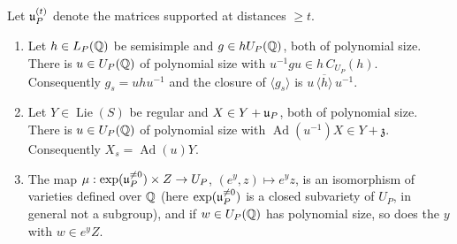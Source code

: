\begin{lemma}\label{lem:iter}
Let $\mathfrak{u}_P^{(t)}$ denote the matrices supported at distances $\ge t$.
\begin{enumerate}
\item Let $h\in L_P(\mathbb{Q})$ be semisimple and $g\in hU_P(\mathbb{Q})$, both of polynomial size. There is
$u\in U_P(\mathbb{Q})$ of polynomial size with $u^{-1}gu\in h\,C_{U_P}(h)$. Consequently $g_s=uhu^{-1}$ and the
closure of $\langle g_s\rangle$ is $u\,\overline{\langle h\rangle}\,u^{-1}$.
\item Let $Y\in\operatorname{Lie}(S)$ be regular and $X\in Y+\mathfrak{u}_P$, both of polynomial size. There is
$u\in U_P(\mathbb{Q})$ of polynomial size with $\operatorname{Ad}(u^{-1})X\in Y+\mathfrak z$. Consequently
$X_s=\operatorname{Ad}(u)Y$.
\item The map $\mu:\exp(\mathfrak{u}_P^{\ne0})\times Z\to U_P$, $(e^y,z)\mapsto e^yz$, is an isomorphism of
varieties defined over $\mathbb{Q}$ (here $\exp(\mathfrak{u}_P^{\ne0})$ is a closed subvariety of $U_P$, in general not a
subgroup), and if $w\in U_P(\mathbb{Q})$ has polynomial size, so does the $y$ with
$w\in e^yZ$.
\end{enumerate}
\end{lemma}
